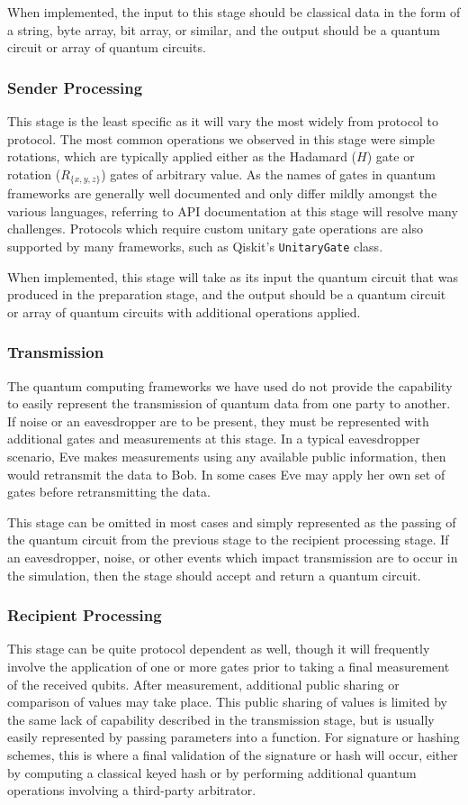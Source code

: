 \documentclass[sigconf]{acmart}
\begin{document}
When implemented, the input to this stage should be classical data in the form of a string, byte array, bit array, or similar, and the output should be a quantum circuit or array of quantum circuits.

\subsubsection{Sender Processing}
This stage is the least specific as it will vary the most widely from protocol to protocol. The most common operations we observed in this stage were simple rotations, which are typically applied either as the Hadamard ($H$) gate or rotation ($R_{\{x,y,z\}}$) gates of arbitrary value. As the names of gates in quantum frameworks are generally well documented and only differ mildly amongst the various languages, referring to API documentation at this stage will resolve many challenges. Protocols which require custom unitary gate operations are also supported by many frameworks, such as Qiskit's \texttt{UnitaryGate} class.

When implemented, this stage will take as its input the quantum circuit that was produced in the preparation stage, and the output should be a quantum circuit or array of quantum circuits with additional operations applied.

\subsubsection{Transmission}
The quantum computing frameworks we have used do not provide the capability to easily represent the transmission of quantum data from one party to another. If noise or an eavesdropper are to be present, they must be represented with additional gates and measurements at this stage. In a typical eavesdropper scenario, Eve makes measurements using any available public information, then would retransmit the data to Bob. In some cases Eve may apply her own set of gates before retransmitting the data.

This stage can be omitted in most cases and simply represented as the passing of the quantum circuit from the previous stage to the recipient processing stage. If an eavesdropper, noise, or other events which impact transmission are to occur in the simulation, then the stage should accept and return a quantum circuit.

\subsubsection{Recipient Processing}
This stage can be quite protocol dependent as well, though it will frequently involve the application of one or more gates prior to taking a final measurement of the received qubits. After measurement, additional public sharing or comparison of values may take place. This public sharing of values is limited by the same lack of capability described in the transmission stage, but is usually easily represented by passing parameters into a function. For signature or hashing schemes, this is where a final validation of the signature or hash will occur, either by computing a classical keyed hash or by performing additional quantum operations involving a third-party arbitrator.
\end{document}
